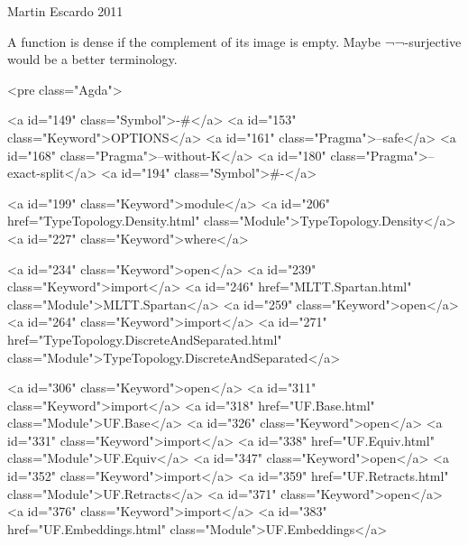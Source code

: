 Martin Escardo 2011

A function is dense if the complement of its image is empty. Maybe
¬¬-surjective would be a better terminology.

<pre class="Agda">

<a id="149" class="Symbol">{-#</a> <a id="153" class="Keyword">OPTIONS</a> <a id="161" class="Pragma">--safe</a> <a id="168" class="Pragma">--without-K</a> <a id="180" class="Pragma">--exact-split</a> <a id="194" class="Symbol">#-}</a>

<a id="199" class="Keyword">module</a> <a id="206" href="TypeTopology.Density.html" class="Module">TypeTopology.Density</a> <a id="227" class="Keyword">where</a>

<a id="234" class="Keyword">open</a> <a id="239" class="Keyword">import</a> <a id="246" href="MLTT.Spartan.html" class="Module">MLTT.Spartan</a>
<a id="259" class="Keyword">open</a> <a id="264" class="Keyword">import</a> <a id="271" href="TypeTopology.DiscreteAndSeparated.html" class="Module">TypeTopology.DiscreteAndSeparated</a>

<a id="306" class="Keyword">open</a> <a id="311" class="Keyword">import</a> <a id="318" href="UF.Base.html" class="Module">UF.Base</a>
<a id="326" class="Keyword">open</a> <a id="331" class="Keyword">import</a> <a id="338" href="UF.Equiv.html" class="Module">UF.Equiv</a>
<a id="347" class="Keyword">open</a> <a id="352" class="Keyword">import</a> <a id="359" href="UF.Retracts.html" class="Module">UF.Retracts</a>
<a id="371" class="Keyword">open</a> <a id="376" class="Keyword">import</a> <a id="383" href="UF.Embeddings.html" class="Module">UF.Embeddings</a>

